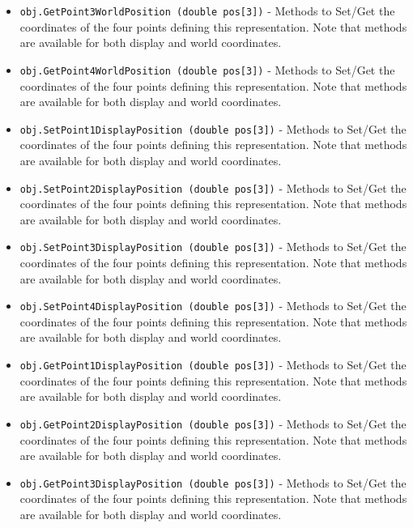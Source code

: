 \begin{itemize}
\item  \verb|obj.GetPoint3WorldPosition (double pos[3])| -  Methods to Set/Get the coordinates of the four points defining
 this representation. Note that methods are available for both
 display and world coordinates.

\item  \verb|obj.GetPoint4WorldPosition (double pos[3])| -  Methods to Set/Get the coordinates of the four points defining
 this representation. Note that methods are available for both
 display and world coordinates.

\item  \verb|obj.SetPoint1DisplayPosition (double pos[3])| -  Methods to Set/Get the coordinates of the four points defining
 this representation. Note that methods are available for both
 display and world coordinates.

\item  \verb|obj.SetPoint2DisplayPosition (double pos[3])| -  Methods to Set/Get the coordinates of the four points defining
 this representation. Note that methods are available for both
 display and world coordinates.

\item  \verb|obj.SetPoint3DisplayPosition (double pos[3])| -  Methods to Set/Get the coordinates of the four points defining
 this representation. Note that methods are available for both
 display and world coordinates.

\item  \verb|obj.SetPoint4DisplayPosition (double pos[3])| -  Methods to Set/Get the coordinates of the four points defining
 this representation. Note that methods are available for both
 display and world coordinates.

\item  \verb|obj.GetPoint1DisplayPosition (double pos[3])| -  Methods to Set/Get the coordinates of the four points defining
 this representation. Note that methods are available for both
 display and world coordinates.

\item  \verb|obj.GetPoint2DisplayPosition (double pos[3])| -  Methods to Set/Get the coordinates of the four points defining
 this representation. Note that methods are available for both
 display and world coordinates.

\item  \verb|obj.GetPoint3DisplayPosition (double pos[3])| -  Methods to Set/Get the coordinates of the four points defining
 this representation. Note that methods are available for both
 display and world coordinates.


\end{itemize}
